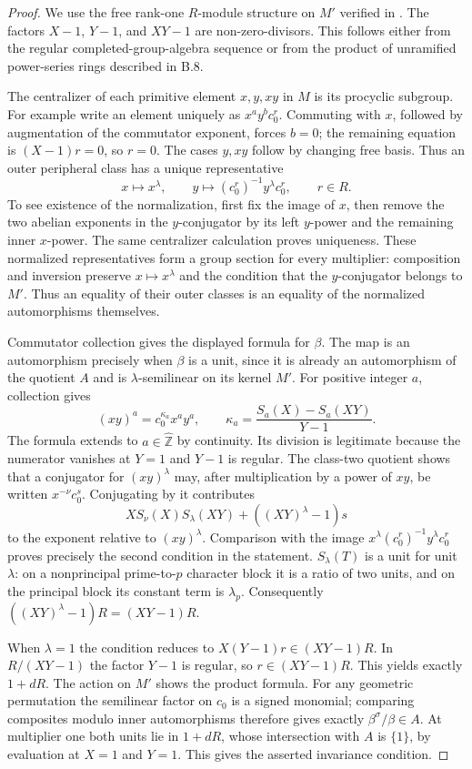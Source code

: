 \begin{proof}
We use the free rank-one $R$-module structure on $M'$ verified in
\cite[Corollary 4.1.5]{PBC_ChenDeligne2017}. The factors $X-1$,
$Y-1$, and $XY-1$ are non-zero-divisors. This follows either from
the regular completed-group-algebra sequence or from the product
of unramified power-series rings described in B.8.

The centralizer of each primitive element $x,y,xy$ in $M$ is its
procyclic subgroup. For example write an element uniquely as
$x^a y^b c_0^r$. Commuting with $x$, followed by augmentation of
the commutator exponent, forces $b=0$; the remaining equation is
$(X-1)r=0$, so $r=0$. The cases $y,xy$ follow by changing free
basis. Thus an outer peripheral class has a unique representative
\[
 x\longmapsto x^\lambda,\qquad
 y\longmapsto (c_0^r)^{-1}y^\lambda c_0^r,
 \qquad r\in R.
\]
To see existence of the normalization, first fix the image of
$x$, then remove the two abelian exponents in the $y$-conjugator
by its left $y$-power and the remaining inner $x$-power. The same
centralizer calculation proves uniqueness. These normalized
representatives form a group section for every multiplier:
composition and inversion preserve $x\mapsto x^\lambda$ and
the condition that the $y$-conjugator belongs to $M'$. Thus
an equality of their outer classes is an equality of the
normalized automorphisms themselves.

Commutator collection gives the displayed formula for $\beta$.
The map is an automorphism precisely when $\beta$ is a unit,
since it is already an automorphism of the quotient $A$ and is
$\lambda$-semilinear on its kernel $M'$. For positive integer $a$,
collection gives
\[
 (xy)^a=c_0^{\kappa_a}x^a y^a,
 \qquad \kappa_a=\frac{S_a(X)-S_a(XY)}{Y-1}.
\]
The formula extends to $a\in\widehat{\mathbb Z}$ by continuity.
Its division is legitimate because the numerator vanishes at $Y=1$
and $Y-1$ is regular. The class-two quotient shows that a conjugator
for $(xy)^\lambda$ may, after multiplication by a power of $xy$,
be written $x^{-\nu}c_0^s$. Conjugating by it contributes
\[
 X S_\nu(X)S_\lambda(XY)+((XY)^\lambda-1)s
\]
to the exponent relative to $(xy)^\lambda$. Comparison with the
image $x^\lambda(c_0^r)^{-1}y^\lambda c_0^r$ proves precisely the
second condition in the statement. $S_\lambda(T)$ is a unit for
unit $\lambda$: on a nonprincipal prime-to-$p$ character block it
is a ratio of two units, and on the principal block its constant
term is $\lambda_p$. Consequently $((XY)^\lambda-1)R=(XY-1)R$.

When $\lambda=1$ the condition reduces to
$X(Y-1)r\in(XY-1)R$. In $R/(XY-1)$ the factor $Y-1$ is regular,
so $r\in(XY-1)R$. This yields exactly $1+dR$. The action on $M'$
shows the product formula. For any geometric permutation the
semilinear factor on $c_0$ is a signed monomial; comparing
composites modulo inner automorphisms therefore gives exactly
$\beta^\sigma/\beta\in A$. At multiplier one both units lie in
$1+dR$, whose intersection with $A$ is $\{1\}$, by evaluation
at $X=1$ and $Y=1$. This gives the asserted invariance condition.
\end{proof}

